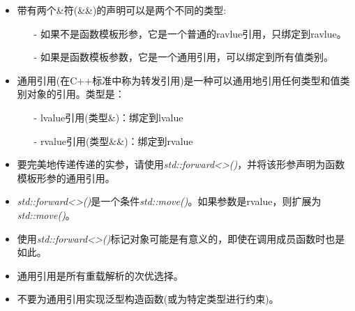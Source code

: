 \begin{itemize}
	\item 带有两个\&符(\&\&)的声明可以是两个不同的类型:
	\begin{itemize}
		\item[-] 如果不是函数模板形参，它是一个普通的ravlue引用，只绑定到ravlue。
		\item[-] 如果是函数模板参数，它是一个通用引用，可以绑定到所有值类别。
	\end{itemize}
	\item 通用引用(在C++标准中称为转发引用)是一种可以通用地引用任何类型和值类别对象的引用。类型是：
		\begin{itemize}
		\item[-] lvalue引用(类型\&)：绑定到lvalue
		\item[-] rvalue引用(类型\&\&)：绑定到rvalue
	\end{itemize}
	\item 要完美地传递传递的实参，请使用\textit{std::forward<>()}，并将该形参声明为函数模板形参的通用引用。
	\item \textit{std::forward<>()}是一个条件\textit{std::move()}。如果参数是rvalue，则扩展为\textit{std::move()}。
	\item 使用\textit{std::forward<>()}标记对象可能是有意义的，即使在调用成员函数时也是如此。
	\item 通用引用是所有重载解析的次优选择。
	\item 不要为通用引用实现泛型构造函数(或为特定类型进行约束)。
\end{itemize}


\newpage